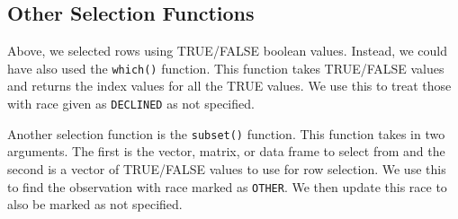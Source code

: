 \documentclass[
  letterpaper,
]{krantz}
\makeatletter
\newenvironment{Shaded}{\begin{snugshade}}{\end{snugshade}}
\newcommand{\FunctionTok}[1]{\textcolor[rgb]{0.28,0.35,0.67}{#1}}
\newcommand{\NormalTok}[1]{\textcolor[rgb]{0.00,0.23,0.31}{#1}}
\newcommand{\OtherTok}[1]{\textcolor[rgb]{0.00,0.23,0.31}{#1}}
\newcommand{\SpecialCharTok}[1]{\textcolor[rgb]{0.37,0.37,0.37}{#1}}
\newcommand{\StringTok}[1]{\textcolor[rgb]{0.13,0.47,0.30}{#1}}
\newenvironment{kframe}{%
\medskip{}
\setlength{\fboxsep}{.8em}
 \def\at@end@of@kframe{}%
 \ifinner\ifhmode%
  \def\at@end@of@kframe{\end{minipage}}%
  \begin{minipage}{\columnwidth}%
 \fi\fi%
 \def\FrameCommand##1{\hskip\@totalleftmargin \hskip-\fboxsep
 \colorbox{shadecolor}{##1}\hskip-\fboxsep
     \hskip-\linewidth \hskip-\@totalleftmargin \hskip\columnwidth}%
 \MakeFramed {\advance\hsize-\width
   \@totalleftmargin\z@ \linewidth\hsize
   \@setminipage}}%
 {\par\unskip\endMakeFramed%
 \at@end@of@kframe}
\renewenvironment{Shaded}{\begin{kframe}}{\end{kframe}}
\makeatother
\begin{document}
\hypertarget{other-selection-functions}{%
\subsection{Other Selection Functions}\label{other-selection-functions}}

Above, we selected rows using TRUE/FALSE boolean values. Instead, we
could have also used the \texttt{which()} function. This function takes
TRUE/FALSE values and returns the index values for all the TRUE values.
We use this to treat those with race given as \texttt{DECLINED} as not
specified.

\begin{Shaded}
\end{Shaded}

Another selection function is the \texttt{subset()} function. This
function takes in two arguments. The first is the vector, matrix, or
data frame to select from and the second is a vector of TRUE/FALSE
values to use for row selection. We use this to find the observation
with race marked as \texttt{OTHER}. We then update this race to also be
marked as not specified.
\end{document}
